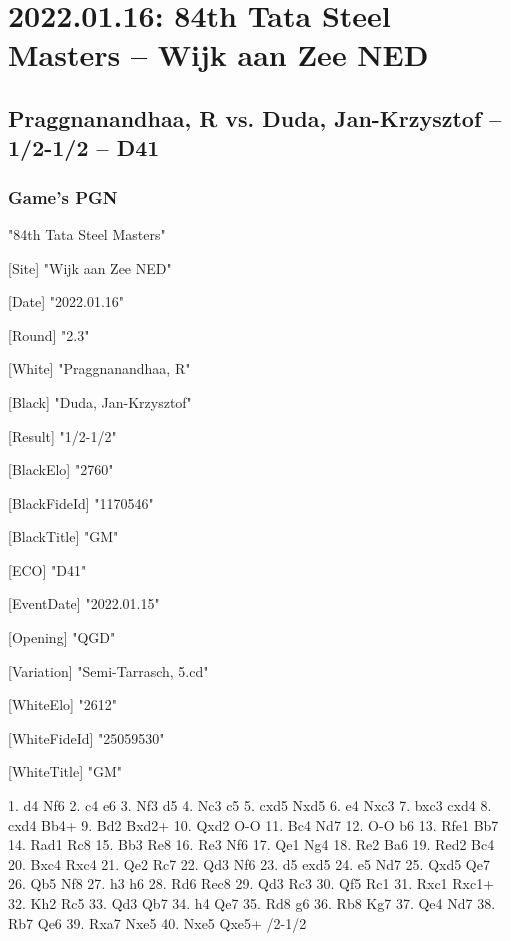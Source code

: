 \documentclass[9pt]{extarticle}
\begin{document}
\section*{2022.01.16: 84th Tata Steel Masters -- Wijk aan Zee NED}

\subsection*{Praggnanandhaa, R vs. Duda, Jan-Krzysztof -- 1/2-1/2 -- D41}
\subsubsection*{Game's PGN}
\begin{flushleft}
[Event] "84th Tata Steel Masters"

[Site] "Wijk aan Zee NED"

[Date] "2022.01.16"

[Round] "2.3"

[White] "Praggnanandhaa, R"

[Black] "Duda, Jan-Krzysztof"

[Result] "1/2-1/2"

[BlackElo] "2760"

[BlackFideId] "1170546"

[BlackTitle] "GM"

[ECO] "D41"

[EventDate] "2022.01.15"

[Opening] "QGD"

[Variation] "Semi-Tarrasch, 5.cd"

[WhiteElo] "2612"

[WhiteFideId] "25059530"

[WhiteTitle] "GM"

\end{flushleft}
\begin{flushleft}
1. d4 Nf6 2. c4 e6 3. Nf3 d5 4. Nc3 c5 5. cxd5 Nxd5 6. e4 Nxc3 7. bxc3 cxd4 8. cxd4 Bb4+ 9. Bd2 Bxd2+ 10. Qxd2 O-O 11. Bc4 Nd7 12. O-O b6 13. Rfe1 Bb7 14. Rad1 Rc8 15. Bb3 Re8 16. Re3 Nf6 17. Qe1 Ng4 18. Re2 Ba6 19. Red2 Bc4 20. Bxc4 Rxc4 21. Qe2 Rc7 22. Qd3 Nf6 23. d5 exd5 24. e5 Nd7 25. Qxd5 Qe7 26. Qb5 Nf8 27. h3 h6 28. Rd6 Rec8 29. Qd3 Rc3 30. Qf5 Rc1 31. Rxc1 Rxc1+ 32. Kh2 Rc5 33. Qd3 Qb7 34. h4 Qe7 35. Rd8 g6 36. Rb8 Kg7 37. Qe4 Nd7 38. Rb7 Qe6 39. Rxa7 Nxe5 40. Nxe5 Qxe5+ \quad  {}/2-1/2
\end{flushleft}
\parindent 0mm
\end{document}
